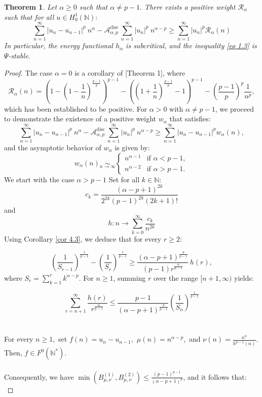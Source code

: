 \documentclass[11pt]{amsart}
\newtheorem{thm}{Theorem}[section]
\newcommand{\1}{[1]}
\begin{document}
\begin{thm} \label{thm 4.12} Let $\alpha \geq 0$ such that $\alpha \neq p-1.$ There exists a positive weight $\mathcal{R}_{\alpha}$ such that for all  $u \in H_{0}^{1}(\mathbb{N}):$ 
$$\sum_{n=1}^{\infty} |u_{n}-u_{n-1}|^{p} \ n^{\alpha}  -  \mathcal{A}^{\text{disc}}_{\alpha,p} \, \sum_{n=1}^{\infty} |u_{n}|^{p} \ n^{\alpha-p} \geq \sum_{n=1}^{\infty} |u_{n}|^{p} \mathcal{R}_{\alpha} (n)$$ 
In particular, the energy functional $h_{\alpha}$ is subcritical, and the inequality \eqref{eq 1.3} is $\Psi$-stable. \\
\end{thm}
\begin{proof} 
The case $\alpha = 0$ is a corollary of \cite{FKP23}[Theorem 1], where   
$$
\mathcal{R}_{\alpha}(n) = \left( 1 - \left( 1 - \frac{1}{n} \right)^{\frac{p-1}{p}} \right)^{p-1} - \left( \left( 1 + \frac{1}{n} \right)^{\frac{p-1}{p}} - 1 \right)^{p-1} - \left(\frac{p-1}{p}\right)^p \frac{1}{n^p},  
$$
which has been established to be positive. For $\alpha>0$ with $\alpha \neq p-1$, we proceed to demonstrate the existence of a positive weight $w_{\alpha}$ that satisfies:
\begin{equation}
\sum_{n=1}^{\infty} |u_{n}-u_{n-1}|^{p} \ n^{\alpha}  -  \mathcal{A}^{\text{disc}}_{\alpha,p} \, \sum_{n=1}^{\infty} |u_{n}|^{p} \ n^{\alpha-p} \geq \sum_{n=1}^{\infty} |u_{n}-u_{n-1}|^{p} w_{\alpha} (n), \tag{4.8} \label{*}
  \end{equation}
and the asymptotic behavior of $w_{\alpha}$ is given by:
$$w_{\alpha}(n) \underset{n \to \infty}{\sim} 
\begin{cases} 
n^{\alpha - 1} & \text{if } \alpha < p-1, \\ 
n^{\alpha - 2} & \text{if } \alpha > p-1. 
\end{cases}$$
We start with the case $\alpha > p - 1$  Set for all $k \in \mathbb{N}:$
$$
c_{k}= \frac{(\alpha-p+1)^{2k}}{2^{2k}(p-1)^{2k} (2k+1)!}  
$$
and 
$$ h: n \to  
\sum_{k=0}^{\infty} \frac{c_k}{ n^{2k}}$$ 
Using Corollary \ref{cor 4.3}, we deduce that for every  $r\geq 2:$

$$ \left( \frac{1}{S_{r-1}} \right)^{\frac{1}{p-1}}- \left( \frac{1}{S_{r}} \right)^{\frac{1}{p-1}} \geq  \frac{(\alpha-p+1)^{\frac{p}{p-1}}}{(p-1) r^{\frac{\alpha}{p-1}}} \, h(r),$$
where $\displaystyle S_{r} = \sum_{k=1}^{r} k^{\alpha-p}.$ For $n \geq 1$, summing $r$ over the range $[n+1, \infty)$ yields:

$$ \sum_{r=n+1}^{\infty} \frac{h(r)}{r^{\frac{\alpha}{p-1}}} \leq  \frac{p-1}{(\alpha-p+1)^{\frac{p}{p-1}}} \left( \frac{1}{S_{n}} \right)^{\frac{1}{p-1}}
$$
\phantom{.} \\ \\
For every $n\geq 1,$ set $f(n)= u_{n}-u_{n-1},$ $\mu(n)= n^{\alpha-p},$ and $\nu(n) = \displaystyle \frac{n^{\alpha}}{h^{p-1}(n)}.$  Then, $f \in F^{0}(\mathbb{N}^{*}).$ \\ \\
Consequently, we have $\min(B_{\mu,\nu}^{(1)},B_{\mu,\nu}^{(2)})  \leq \frac{(p-1)^{p-1}} {(\alpha-p+1)^p}$, and it follows that: \\


\end{proof}
\end{document}
